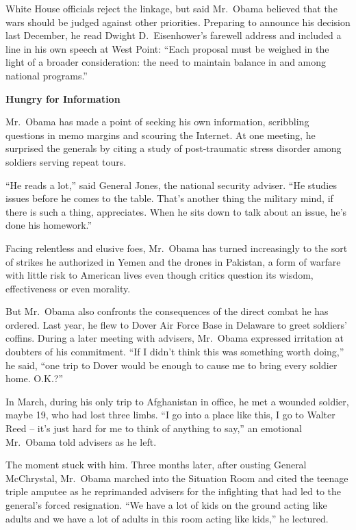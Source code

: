 ﻿\documentclass[12pt]{article}
\begin{document}
White House officials reject the linkage, but said Mr.~Obama believed that the wars should be judged
against other priorities. Preparing to announce his decision last December, he read Dwight
D.~Eisenhower's farewell address and included a line in his own speech at West Point: ``Each
proposal must be weighed in the light of a broader consideration: the need to maintain balance in
and among national programs.''

\textbf{Hungry for Information}

Mr.~Obama has made a point of seeking his own information, scribbling questions in memo margins and
scouring the Internet. At one meeting, he surprised the generals by citing a study of post-traumatic
stress disorder among soldiers serving repeat tours.

``He reads a lot,'' said General Jones, the national security adviser. ``He studies issues before he
comes to the table. That's another thing the military mind, if there is such a thing, appreciates.
When he sits down to talk about an issue, he's done his homework.''

Facing relentless and elusive foes, Mr.~Obama has turned increasingly to the sort of strikes he
authorized in Yemen and the drones in Pakistan, a form of warfare with little risk to American lives
even though critics question its wisdom, effectiveness or even morality.

But Mr.~Obama also confronts the consequences of the direct combat he has ordered. Last year, he
flew to Dover Air Force Base in Delaware to greet soldiers' coffins. During a later meeting with
advisers, Mr.~Obama expressed irritation at doubters of his commitment. ``If I didn't think this was
something worth doing,'' he said, ``one trip to Dover would be enough to cause me to bring every
soldier home. O.K.?''

In March, during his only trip to Afghanistan in office, he met a wounded soldier, maybe 19, who had
lost three limbs. ``I go into a place like this, I go to Walter Reed -- it's just hard for me to
think of anything to say,'' an emotional Mr.~Obama told advisers as he left.

The moment stuck with him. Three months later, after ousting General McChrystal, Mr.~Obama marched
into the Situation Room and cited the teenage triple amputee as he reprimanded advisers for the
infighting that had led to the general's forced resignation. ``We have a lot of kids on the ground
acting like adults and we have a lot of adults in this room acting like kids,'' he lectured.
\end{document}
